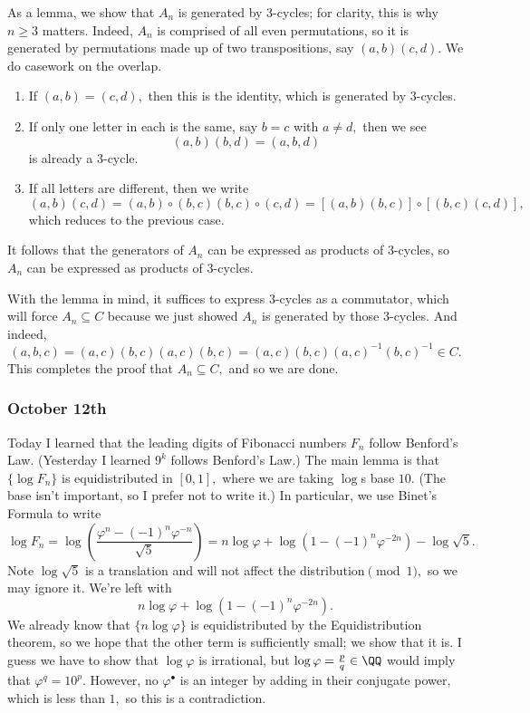 As a lemma, we show that $A_n$ is generated by $3$-cycles; for clarity, this is why $n\ge3$ matters. Indeed, $A_n$ is comprised of all even permutations, so it is generated by permutations made up of two transpositions, say $(a,b)(c,d).$ We do casework on the overlap.
\begin{enumerate}[label=(\roman*)]
    \item If $(a,b)=(c,d),$ then this is the identity, which is generated by $3$-cycles.
    \item If only one letter in each is the same, say $b=c$ with $a\ne d,$ then we see
    \[(a,b)(b,d)=(a,b,d)\]
    is already a $3$-cycle.
    \item If all letters are different, then we write
    \[(a,b)(c,d)=(a,b)\circ(b,c)(b,c)\circ(c,d)=[(a,b)(b,c)]\circ[(b,c)(c,d)],\]
    which reduces to the previous case.
\end{enumerate}
It follows that the generators of $A_n$ can be expressed as products of $3$-cycles, so $A_n$ can be expressed as products of $3$-cycles.

With the lemma in mind, it suffices to express $3$-cycles as a commutator, which will force $A_n\subseteq C$ because we just showed $A_n$ is generated by those $3$-cycles. And indeed,
\[(a,b,c)=(a,c)(b,c)(a,c)(b,c)=(a,c)(b,c)(a,c)^{-1}(b,c)^{-1}\in C.\]
This completes the proof that $A_n\subseteq C,$ and so we are done.

\subsubsection{October 12th}
Today I learned that the leading digits of Fibonacci numbers $F_n$ follow Benford's Law. (Yesterday I learned $9^k$ follows Benford's Law.) The main lemma is that $\{\log F_n\}$ is equidistributed in $[0,1],$ where we are taking $\log$s base $10.$ (The base isn't important, so I prefer not to write it.) In particular, we use Binet's Formula to write
\[\log F_n=\log\left(\frac{\varphi^n-(-1)^n\varphi^{-n}}{\sqrt5}\right)=n\log\varphi+\log\left(1-(-1)^n\varphi^{-2n}\right)-\log\sqrt5.\]
Note $\log\sqrt5$ is a translation and will not affect the distribution$\pmod1,$ so we may ignore it. We're left with
\[n\log\varphi+\log\left(1-(-1)^n\varphi^{-2n}\right).\]
We already know that $\{n\log\varphi\}$ is equidistributed by the Equidistribution theorem, so we hope that the other term is sufficiently small; we show that it is. I guess we have to show that $\log\varphi$ is irrational, but $\log\varphi=\frac pq\in\QQ$ would imply that $\varphi^q=10^p.$ However, no $\varphi^\bullet$ is an integer by adding in their conjugate power, which is less than $1,$ so this is a contradiction.

